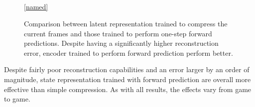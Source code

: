 \begin{figure}[!t]
  \captionsetup[subfloat]{position=top,labelformat=empty}
  \centering

    \subfloat[]{  \resizebox{0.4\textwidth}{!}{}}
    \subfloat[]{  \resizebox{0.4\textwidth}{!}{}}\\
  \vspace{-1cm}
    \subfloat[]{  \resizebox{0.4\textwidth}{!}{}}
    \subfloat[]{  \resizebox{0.4\textwidth}{!}{}}\\
  \vspace{-1cm}
    \subfloat[]{  \resizebox{0.4\textwidth}{!}{}}
    \subfloat[]{  \resizebox{0.4\textwidth}{!}{}}\\
  \vspace{-1cm}
    \subfloat[]{  \resizebox{0.4\textwidth}{!}{}}
  \\

  \ref{named}
  \caption{Comparison between latent representation trained to compress the current frames and 
  those trained to perform one-step forward predictions. Despite having a significantly higher reconstruction error,
encoder trained to perform forward prediction perform better.}
  \label{fig:forward-vs-compression}
\end{figure}


Despite fairly poor reconstruction capabilities and an error larger by an order of magnitude, 
state representation trained with forward 
prediction are overall more effective than simple compression.
As with all results, the effects vary from game to game.



